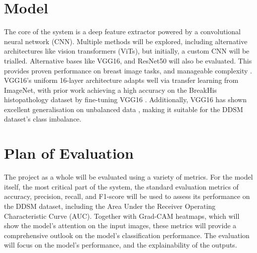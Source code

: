 \documentclass[../main]{subfiles}
\begin{document}
\section{Model}
The core of the system is a deep feature extractor powered by a convolutional neural network (CNN). Multiple methods will be explored, including alternative architectures like vision transformers (ViTs), but initially, a custom CNN will be trialled. Alternative bases like VGG16, and ResNet50 will also be evaluated. This provides proven performance on breast image tasks, and manageable complexity \autocite{fatima2025application}. VGG16's uniform 16-layer architecture adapts well via transfer learning from ImageNet, with prior work achieving a high accuracy on the BreakHis histopathology dataset by fine-tuning VGG16 \autocite{fatima2025application}. Additionally, VGG16 has shown excellent generalisation on unbalanced data \autocite{fatima2025application}, making it suitable for the DDSM dataset's class imbalance.

\section{Plan of Evaluation}
The project as a whole will be evaluated using a variety of metrics. For the model itself, the most critical part of the system, the standard evaluation metrics of accuracy, precision, recall, and F1-score will be used to assess its performance on the DDSM dataset, including the Area Under the Receiver Operating Characteristic Curve (AUC). Together with Grad-CAM heatmaps, which will show the model's attention on the input images, these metrics will provide a comprehensive outlook on the model's classification performance. The evaluation will focus on the model's performance, and the explainability of the outputs.
\end{document}
